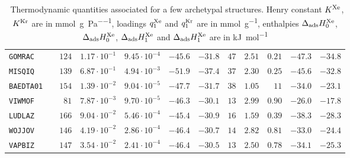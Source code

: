 \documentclass[main.tex]{subfiles}
\begin{document}
\begin{table}[hb]
\begin{tabular}{|lr|rrrrr|rrrrr|}
        \texttt{GOMRAC} & \cite{GOMREG_GOMRAC} &  $124$  &  $1.17\cdot10^{-1}$  &  $9.45\cdot10^{-4}$  &  $-45.6$  &  $-31.8$  &  $ 47$  &  $2.51$  &  $0.21$  &  $-47.3$  &  $-34.8$  \\
        \texttt{MISQIQ} & \cite{MISQIQ}        &  $139$  &  $6.87\cdot10^{-1}$  &  $4.94\cdot10^{-3}$  &  $-51.9$  &  $-37.4$  &  $ 37$  &  $2.30$  &  $0.25$  &  $-45.6$  &  $-32.8$  \\
        \texttt{BAEDTA01} & \cite{BAEDTA01}      &  $154$  &  $1.39\cdot10^{-2}$  &  $9.04\cdot10^{-5}$  &  $-47.7$  &  $-31.7$  &  $ 38$  &  $1.05$  &  $  11$  &  $-34.0$  &  $-23.1$  \\
        \texttt{VIWMOF} & \cite{VIWMOF}        &  $ 81$  &  $7.87\cdot10^{-3}$  &  $9.70\cdot10^{-5}$  &  $-46.3$  &  $-30.1$  &  $ 13$  &  $2.99$  &  $0.90$  &  $-26.0$  &  $-17.8$  \\
        \texttt{LUDLAZ} & \cite{LUDLAZ}        &  $166$  &  $9.04\cdot10^{-2}$  &  $5.46\cdot10^{-4}$  &  $-45.4$  &  $-30.9$  &  $ 16$  &  $1.59$  &  $0.39$  &  $-38.3$  &  $-28.3$  \\
        \texttt{WOJJOV} & \cite{WOJJOV}        &  $146$  &  $4.19\cdot10^{-2}$  &  $2.86\cdot10^{-4}$  &  $-46.4$  &  $-30.7$  &  $ 14$  &  $2.82$  &  $0.81$  &  $-33.0$  &  $-24.4$  \\
        \texttt{VAPBIZ} & \cite{VAPBIZ}        &  $147$  &  $3.54\cdot10^{-2}$  &  $2.41\cdot10^{-4}$  &  $-46.4$  &  $-30.5$  &  $ 13$  &  $2.50$  &  $0.78$  &  $-34.1$  &  $-25.3$  \\
    \hline
    \end{tabular}
    \caption{\ Thermodynamic quantities associated for a few archetypal structures. Henry constant $K^{\text{Xe}}$, $K^{\text{Kr}}$ are in \si{\milli\mol\per\gram\per\pascal}, loadings $q^{\text{Xe}}_{\text{1}}$ and $q^{\text{Kr}}_{\text{1}}$ are in \si{\milli\mol\per\gram}, enthalpies $\Delta_{\text{ads}}H^{\text{Xe}}_{\text{0}}$, $\Delta_{\text{ads}}H^{\text{Xe}}_{\text{0}}$, $\Delta_{\text{ads}}H^{\text{Xe}}_{\text{1}}$ and $\Delta_{\text{ads}}H^{\text{Xe}}_{\text{1}}$ are in \si{\kilo\joule\per\mol}}\label{tbl:thermo}
\end{table}
\end{document}
